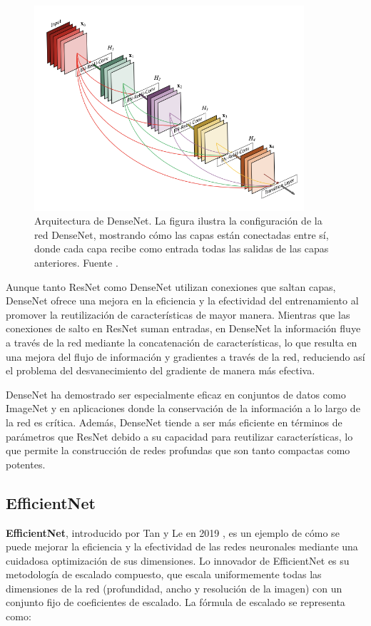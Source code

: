 \begin{figure}
	\label{key}
	\centering
	\includegraphics[width=100mm]{img/densenet.png}
	\caption{Arquitectura de DenseNet. La figura ilustra la configuración de la red DenseNet, mostrando cómo las capas están conectadas entre sí, donde cada capa recibe como entrada todas las salidas de las capas anteriores. Fuente \cite{huang2017densely}.}
\end{figure}

Aunque tanto ResNet como DenseNet utilizan conexiones que saltan capas, DenseNet ofrece una mejora en la eficiencia y la efectividad del entrenamiento al promover la reutilización de características de mayor manera. Mientras que las conexiones de salto en ResNet suman entradas, en DenseNet la información fluye a través de la red mediante la concatenación de características, lo que resulta en una mejora del flujo de información y gradientes a través de la red, reduciendo así el problema del desvanecimiento del gradiente de manera más efectiva.

DenseNet ha demostrado ser especialmente eficaz en conjuntos de datos como ImageNet y en aplicaciones donde la conservación de la información a lo largo de la red es crítica. Además, DenseNet tiende a ser más eficiente en términos de parámetros que ResNet debido a su capacidad para reutilizar características, lo que permite la construcción de redes profundas que son tanto compactas como potentes.

\subsection{EfficientNet}

\textbf{EfficientNet}, introducido por Tan y Le en 2019 \cite{tan2019efficientnet}, es un ejemplo de cómo se puede mejorar la eficiencia y la efectividad de las redes neuronales mediante una cuidadosa optimización de sus dimensiones. Lo innovador de EfficientNet es su metodología de escalado compuesto, que escala uniformemente todas las dimensiones de la red (profundidad, ancho y resolución de la imagen) con un conjunto fijo de coeficientes de escalado. La fórmula de escalado se representa como:

